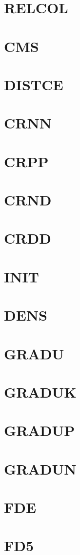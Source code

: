 \documentclass[14pt,UTF8]{ctexbook}
\begin{document}
\section{RELCOL}
\section{CMS}
\section{DISTCE}
\section{CRNN}
\section{CRPP}
\section{CRND}
\section{CRDD}
\section{INIT}
\section{DENS}
\section{GRADU}
\section{GRADUK}
\section{GRADUP}
\section{GRADUN}
\section{FDE}
\section{FD5}
\end{document}
